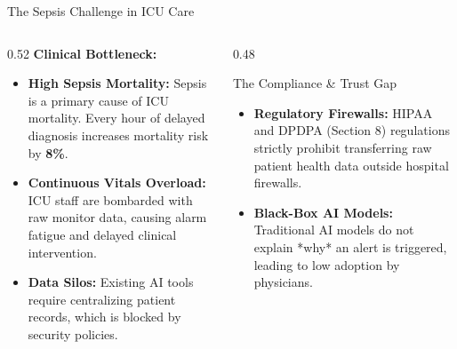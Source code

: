 \documentclass[aspectratio=169, 11pt]{beamer}
\begin{document}
\begin{frame}{The Sepsis Challenge in ICU Care}
    \begin{columns}
        \begin{column}{0.52\textwidth}
            \textbf{Clinical Bottleneck:}
            \begin{itemize}
                \scriptsize
                \item \textbf{High Sepsis Mortality:} Sepsis is a primary cause of ICU mortality. Every hour of delayed diagnosis increases mortality risk by \textbf{8\%}.
                \item \textbf{Continuous Vitals Overload:} ICU staff are bombarded with raw monitor data, causing alarm fatigue and delayed clinical intervention.
                \item \textbf{Data Silos:} Existing AI tools require centralizing patient records, which is blocked by security policies.
            \end{itemize}
        \end{column}
        
        \begin{column}{0.48\textwidth}
            \begin{alertblock}{The Compliance \& Trust Gap}
                \scriptsize
                \begin{itemize}
                    \item \textbf{Regulatory Firewalls:} HIPAA and DPDPA (Section 8) regulations strictly prohibit transferring raw patient health data outside hospital firewalls.
                    \item \textbf{Black-Box AI Models:} Traditional AI models do not explain *why* an alert is triggered, leading to low adoption by physicians.
                \end{itemize}
            \end{alertblock}
        \end{column}
    \end{columns}
\end{frame}
\end{document}
